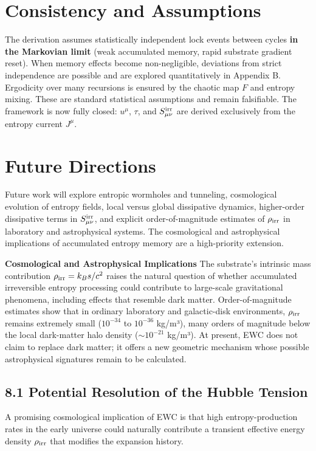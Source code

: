 \documentclass[11pt,letterpaper]{article}
\begin{document}
\section{Consistency and Assumptions}
The derivation assumes statistically independent lock events between cycles \textbf{in the Markovian limit} (weak accumulated memory, rapid substrate gradient reset). When memory effects become non-negligible, deviations from strict independence are possible and are explored quantitatively in Appendix B. Ergodicity over many recursions is ensured by the chaotic map \(F\) and entropy mixing. These are standard statistical assumptions and remain falsifiable. The framework is now fully closed: \(u^\mu\), \(\tau\), and \(S_{\mu\nu}^{\rm irr}\) are derived exclusively from the entropy current \(J^\mu\).

\section{Future Directions}
Future work will explore entropic wormholes and tunneling, cosmological evolution of entropy fields, local versus global dissipative dynamics, higher-order dissipative terms in \(S_{\mu\nu}^{\rm irr}\), and explicit order-of-magnitude estimates of \(\rho_{\rm irr}\) in laboratory and astrophysical systems. The cosmological and astrophysical implications of accumulated entropy memory are a high-priority extension.

\textbf{Cosmological and Astrophysical Implications}  
The substrate’s intrinsic mass contribution \(\rho_{\rm irr} = k_B s / c^2\) raises the natural question of whether accumulated irreversible entropy processing could contribute to large-scale gravitational phenomena, including effects that resemble dark matter. Order-of-magnitude estimates show that in ordinary laboratory and galactic-disk environments, \(\rho_{\rm irr}\) remains extremely small (\(10^{-34}\) to \(10^{-36}\) kg/m³), many orders of magnitude below the local dark-matter halo density (\(\sim 10^{-21}\) kg/m³). At present, EWC does not claim to replace dark matter; it offers a new geometric mechanism whose possible astrophysical signatures remain to be calculated.

\subsection{8.1 Potential Resolution of the Hubble Tension}
A promising cosmological implication of EWC is that high entropy-production rates in the early universe could naturally contribute a transient effective energy density \(\rho_{\rm irr}\) that modifies the expansion history.
\end{document}
